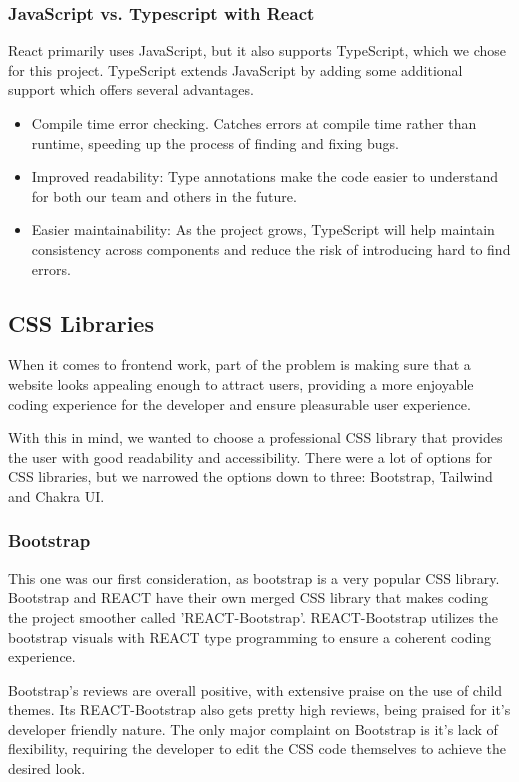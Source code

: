 \documentclass[12pt]{article}
\begin{document}
\subsubsection{JavaScript vs. Typescript with React}
React primarily uses JavaScript, but it also supports TypeScript, which we chose for this project. TypeScript extends JavaScript by adding some additional support which offers several advantages. 
\begin{itemize}
	\item Compile time error checking. Catches errors at compile time rather than runtime, speeding up the process of finding and fixing bugs.
	\item Improved readability: Type annotations make the code easier to understand for both our team and others in the future. 
	\item Easier maintainability: As the project grows, TypeScript will help maintain consistency across components and reduce the risk of introducing hard to find errors.
\end{itemize}

\subsection{CSS Libraries}
When it comes to frontend work, part of the problem is making sure that a website looks appealing enough to attract users, providing a more enjoyable coding experience for the developer and ensure pleasurable user experience. %

With this in mind, we wanted to choose a professional CSS library that provides the user with good readability and accessibility.
There were a lot of options for CSS libraries, but we narrowed the options down to three: Bootstrap, Tailwind and Chakra UI.

\subsubsection{Bootstrap}
This one was our first consideration, as bootstrap is a very popular CSS library.
Bootstrap and REACT have their own merged CSS library that makes coding the project smoother called 'REACT-Bootstrap'.
REACT-Bootstrap utilizes the bootstrap visuals with REACT type programming to ensure a coherent coding experience.

Bootstrap's reviews are overall positive, with extensive praise on the use of child themes.
Its REACT-Bootstrap also gets pretty high reviews, being praised for it's developer friendly nature.
The only major complaint on Bootstrap is it's lack of flexibility, requiring the developer to edit the CSS code themselves to achieve the desired look.
\end{document}
